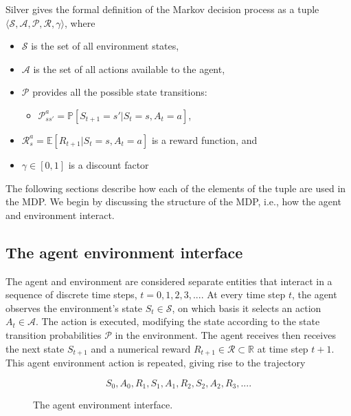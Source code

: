 Silver \cite{silver2015} gives the formal definition of the Markov decision process as a tuple $\langle \mathcal{S,A,P,R}, \gamma \rangle$, where 
\begin{itemize}
    \item $\mathcal{S}$ is the set of all environment states,
    \item $\mathcal{A}$ is the set of all actions available to the agent,
    \item $\mathcal{P}$ provides all the possible state transitions:
    \begin{itemize}
        \item $\mathcal{P}_{ss'}^{a} = \mathbb{P} [S_{t+1}=s' |  S_t=s, A_t=a]$,
    \end{itemize}
    \item $\mathcal{R}_{s}^{a} = \mathbb{E} [R_{t+1} | S_t=s, A_t=a]$ is a reward function, and
    \item $\gamma \in [0,1]$ is a discount factor
\end{itemize}
The following sections describe how each of the elements of the tuple are used in the MDP. We begin by discussing the structure of the MDP, i.e., how the agent and environment interact. 

\subsection{The agent environment interface}
\label{sec:agent_environment_interface}
The agent and environment are considered separate entities that interact in a sequence of discrete time steps, $t=0,1,2,3, ...$.
At every time step $t$, the agent observes the environment's state $S_t \in \mathcal{S}$, on which basis it selects an action $A_t \in \mathcal{A}$.
The action is executed, modifying the state according to the state transition probabilities $\mathcal{P}$ in the environment.
The agent receives then receives the next state $S_{t+1}$ and a numerical reward $R_{t+1} \in \mathcal{R} \subset{\mathbb{R}} $ at time step $t+1$. This agent environment action is repeated, giving rise to the trajectory

\begin{equation}
S_0, A_0, R_1, S_1, A_1, R_2, S_2, A_2, R_3, ... .
\label{eq:mdp_trajectory}
\end{equation}

\begin{figure}[!htb]
\centering

\caption[The agent environment interface]{The agent environment interface.}
\label{fig:agent_env_boundary}
\end{figure}

